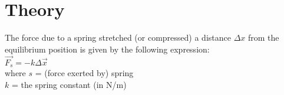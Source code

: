 \let\clearpage\relax\chapter{Theory}
\endgroup

The force due to a spring stretched (or compressed) a distance $\Delta x$ from the 
equilibrium position is given by the following expression:\\

$\vec{F_s} = -k\Delta \vec{x}$\\

\noindent where $s$ = (force exerted by) spring\\
\indent\indent $k$ = the spring constant (in N/m)\\
